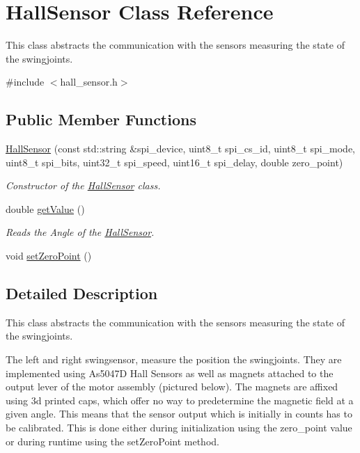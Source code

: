 \hypertarget{classHallSensor}{}\section{Hall\+Sensor Class Reference}
\label{classHallSensor}


This class abstracts the communication with the sensors measuring the state of the swingjoints.  




{\ttfamily \#include $<$hall\+\_\+sensor.\+h$>$}

\subsection*{Public Member Functions}
\begin{DoxyCompactItemize}
\item 
\hyperlink{classHallSensor_ac901b856eff0dffb4dfa5fdeaf888c4c}{Hall\+Sensor} (const std\+::string \&spi\+\_\+device, uint8\+\_\+t spi\+\_\+cs\+\_\+id, uint8\+\_\+t spi\+\_\+mode, uint8\+\_\+t spi\+\_\+bits, uint32\+\_\+t spi\+\_\+speed, uint16\+\_\+t spi\+\_\+delay, double zero\+\_\+point)
\begin{DoxyCompactList}\small\item\em Constructor of the \hyperlink{classHallSensor}{Hall\+Sensor} class. \end{DoxyCompactList}\item 
double \hyperlink{classHallSensor_a5eea1969e798bc786c5fa165aeb47c77}{get\+Value} ()
\begin{DoxyCompactList}\small\item\em Reads the Angle of the \hyperlink{classHallSensor}{Hall\+Sensor}. \end{DoxyCompactList}\item 
void \hyperlink{classHallSensor_ac97079734e670ba56401e6a8b37144e8}{set\+Zero\+Point} ()
\end{DoxyCompactItemize}


\subsection{Detailed Description}
This class abstracts the communication with the sensors measuring the state of the swingjoints. 

The left and right swingsensor, measure the position the swingjoints. They are implemented using As5047D Hall Sensors as well as magnets attached to the output lever of the motor assembly (pictured below).  The magnets are affixed using 3d printed caps, which offer no way to predetermine the magnetic field at a given angle. This means that the sensor output which is initially in counts has to be calibrated. This is done either during initialization using the zero\+\_\+point value or during runtime using the set\+Zero\+Point method.

